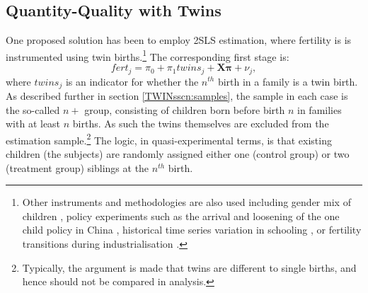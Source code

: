 \documentclass[subeqn]{article}
\begin{document}
\begin{spacing}{1.4}
\subsection{Quantity-Quality with Twins}           \label{TWINsscn:methodQQ}
One proposed solution has been to employ 2SLS estimation, where fertility is 
is instrumented using twin births.\footnote{Other instruments and methodologies 
are also used including gender mix of children \citep{ConleyGlauber2006}, policy 
experiments such as the arrival and loosening of the one child policy in China
\citep{Qian2009,ArgysAverett2015}, historical time series variation in schooling 
\citep{BleakleyLange2009}, or fertility transitions during industrialisation 
\citep{DalgaardStrulik2015}.}  The corresponding first stage is:
\begin{equation}
\label{TWINeqn:firststage}
fert_{j}=\pi_0+\pi_1 twins_{j}+\bm{X}\bm{\pi}+\nu_{j},
\end{equation}
where $twins_j$ is an indicator for whether the $n^{th}$ birth in a family is a 
twin birth. As described further in section \ref{TWINsscn:samples}, the sample 
in each case is the so-called $n+$ group, consisting of children born before 
birth $n$ in families with at least $n$ births. As such the twins themselves are 
excluded from the estimation sample.\footnote{Typically, the argument is made 
that twins are different to single births, and hence should not be compared in 
analysis.} The logic, in quasi-experimental terms, is that existing children 
(the subjects) are randomly assigned either one (control group) or two 
(treatment group) siblings at the $n^{th}$ birth.


\end{spacing}
\end{document}
